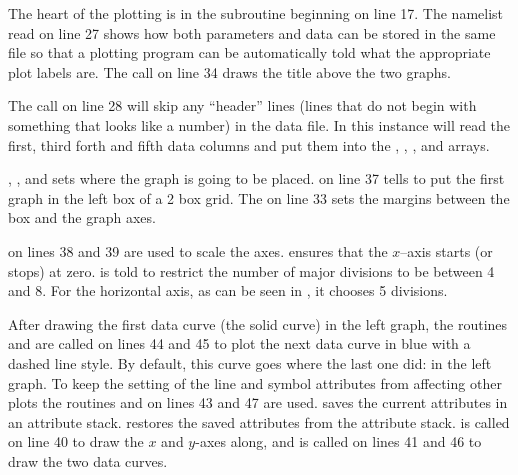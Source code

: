 The heart of the plotting is in the subroutine  beginning
on line 17. The namelist read on line 27 shows how both parameters and
data can be stored in the same file so that a plotting program can be
automatically told what the appropriate plot labels are. The
 call on line 34 draws the 
title above the two graphs.

The  call on line 28 will skip
any ``header'' lines (lines that do not begin with something that looks
like a number) in the data file. In this instance
 will read the first, third forth
and fifth data columns and put them into the , , , and
 arrays.

,
, and
 sets where the graph is
going to be placed.   on line 37 tells \quickplot to put the first graph in the left box
of a 2 box grid. The  on line
33 sets the margins between the box and the graph axes.

 on lines 38
and 39 are used to scale the axes.  ensures that the
$x$--axis starts (or stops) at zero.
 is told to
restrict the number of major divisions to be between 4 and 8. For the
horizontal axis, as can be seen in , it chooses
5 divisions.

After drawing the first data curve (the solid curve) in the left
graph, the routines
 and
 are called on
lines 44 and 45 to plot the next data curve in blue with a dashed line
style. By default, this curve goes where the last one did: in the left
graph. To keep the setting of the line and symbol attributes from
affecting other plots the routines
 and
 on lines 43 and 47 are
used.  saves the current
attributes in an attribute
stack.  restores the
saved attributes from the attribute
stack.  is called on line 40 to
draw the $x$ and $y$-axes along, and  is called on
lines 41 and 46 to draw the two data curves.

